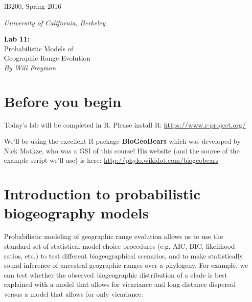 \documentclass[11pt]{article}
\begin{document}
\noindent
\large
\begin{minipage}{0.5\textwidth}
\begin{flushleft} 
IB200, Spring 2016
\end{flushleft}
\end{minipage}
\begin{minipage}{0.5\textwidth}
\begin{flushright} 
\textit{University of California, Berkeley}
\end{flushright}
\end{minipage}

\vspace{0.5cm}


\begin{center}
\Large \textbf{Lab 11:} \\
Probabilistic Models of \\
Geographic Range Evolution \\
\normalsize
\textit{By Will Freyman} \\
\end{center}

\vspace{0.5cm}

\section{Before you begin}

Today's lab will be completed in R.
Please install R: \url{https://www.r-project.org/}

We'll be using the excellent R package \textbf{BioGeoBears}
which was developed by Nick Matkze, who was a GSI of this course!
His website (and the source of the example script we'll use)
is here:
\url{http://phylo.wikidot.com/biogeobears}

\section{Introduction to probabilistic biogeography models}


Probabilistic modeling of geographic range evolution 
allows us to use the standard set of statistical model choice
procedures (e.g. AIC, BIC, likelihood ratios, etc.)
to test different biogeographical scenarios,
and to make statistically sound inference of ancestral
geographic ranges over a phylogeny.
For example, we can test whether the observed 
biogeographic distribution of a clade is best
explained with a model that allows for 
vicariance and long-distance dispersal versus
a model that allows for only vicariance.
\end{document}
